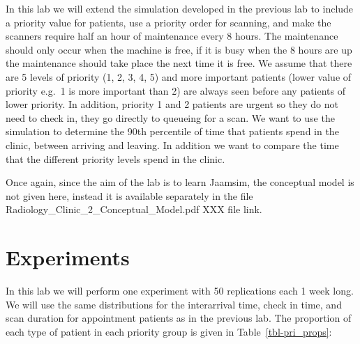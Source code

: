 \documentclass[
  10pt,
  a4paperpaper,
  DIV=11,
  numbers=noendperiod,
  oneside]{scrreprt}
\begin{document}
In this lab we will extend the simulation developed in the previous lab
to include a priority value for patients, use a priority order for
scanning, and make the scanners require half an hour of maintenance
every 8 hours. The maintenance should only occur when the machine is
free, if it is busy when the 8 hours are up the maintenance should take
place the next time it is free. We assume that there are 5 levels of
priority (1, 2, 3, 4, 5) and more important patients (lower value of
priority e.g.~1 is more important than 2) are always seen before any
patients of lower priority. In addition, priority 1 and 2 patients are
urgent so they do not need to check in, they go directly to queueing for
a scan. We want to use the simulation to determine the 90th percentile
of time that patients spend in the clinic, between arriving and leaving.
In addition we want to compare the time that the different priority
levels spend in the clinic.

Once again, since the aim of the lab is to learn Jaamsim, the conceptual
model is not given here, instead it is available separately in the file
Radiology\_Clinic\_2\_Conceptual\_Model.pdf XXX file link.

\section{Experiments}\label{experiments-1}

In this lab we will perform one experiment with 50 replications each 1
week long. We will use the same distributions for the interarrival time,
check in time, and scan duration for appointment patients as in the
previous lab. The proportion of each type of patient in each priority
group is given in Table~\ref{tbl-pri_props}:

\begin{table}[H]

\caption{\label{tbl-pri_props}Patient Priority Proportions}


\end{table}%
\end{document}
